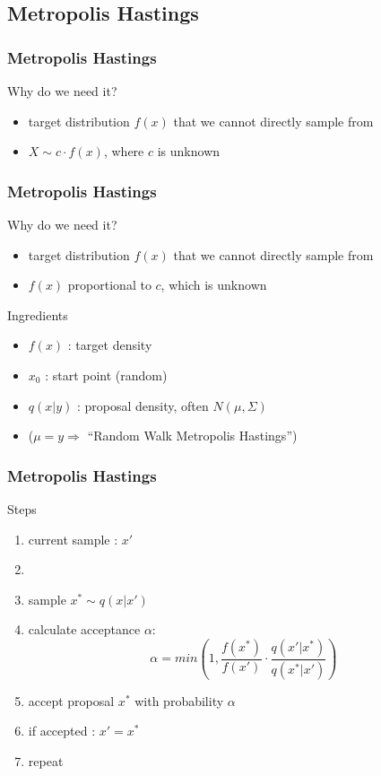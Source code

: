 
\subsection{Metropolis Hastings}


\begin{frame}
\frametitle{Metropolis Hastings}

\begin{block}{Why do we need it?}
\begin{itemize}
\item target distribution $f(x)$ that we cannot directly sample from
\item $X \sim c \cdot f(x)$, where $c$ is unknown
\end{itemize}
\end{block}

\end{frame}


\begin{frame}
\frametitle{Metropolis Hastings}

\begin{block}{Why do we need it?}
\begin{itemize}
\item target distribution $f(x)$ that we cannot directly sample from
\item $f(x)$ proportional to $c$, which is unknown
\end{itemize}
\end{block}

\begin{block}{Ingredients}
\begin{itemize}
\item $f(x)$ : target density
\item $x_0$ : start point (random)
\item $q(x|y)$ : proposal density, often $N(\mu, \Sigma)$ \\
\item[] \quad \quad  \quad  \quad  ($\mu = y \Rightarrow$ ``Random Walk
Metropolis Hastings'')
\end{itemize}
\end{block}

\end{frame}

\begin{frame}
\frametitle{Metropolis Hastings}

\begin{block}{Steps}
\begin{enumerate}
  \item current sample : $x'$
  \item[]
\item sample $x^* \sim q(x | x')$
\item calculate acceptance $\alpha$:
\[\alpha = min\left(1, \frac{f(x^*)}{f(x')} \cdot
\frac{q(x'|x^*)}{q(x^*|x')} \right)\]

\item accept proposal $x^*$ with probability $\alpha$
\item if accepted : $x' = x^*$
\item repeat
\end{enumerate}
\end{block}
\end{frame}


